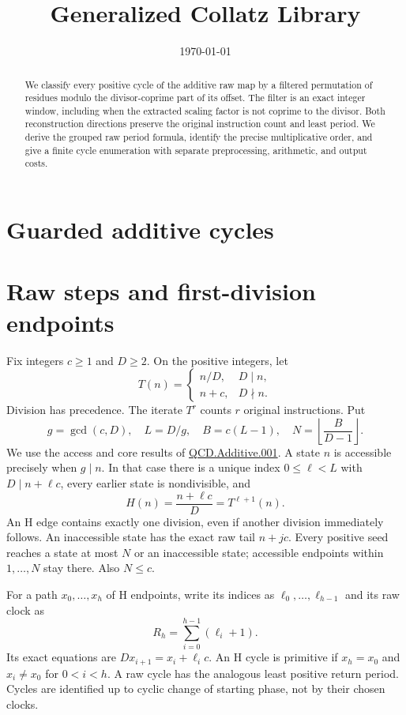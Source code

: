 \documentclass[11pt,letterpaper]{article}
\title{Generalized Collatz Library}
\author{}
\date{\today}
\begin{document}
\maketitle
\section*{Guarded additive cycles}

\begin{abstract}
We classify every positive cycle of the additive raw map by a filtered
permutation of residues modulo the divisor-coprime part of its offset.
The filter is an exact integer window, including when the extracted scaling
factor is not coprime to the divisor. Both reconstruction directions preserve
the original instruction count and least period. We derive the grouped raw
period formula, identify the precise multiplicative order, and give a finite
cycle enumeration with separate preprocessing, arithmetic, and output costs.
\end{abstract}

\section{Raw steps and first-division endpoints}

Fix integers $c\ge1$ and $D\ge2$. On the positive integers, let
\[
T(n)=\begin{cases}n/D,&D\mid n,\\n+c,&D\nmid n.\end{cases}
\]
Division has precedence. The iterate $T^r$ counts $r$ original instructions.
Put
\[
g=\gcd(c,D),\quad L=D/g,\quad B=c(L-1),\quad
N=\left\lfloor\frac{B}{D-1}\right\rfloor.
\]
We use the access and core results of
\href{../../QCD.Additive.001/tex/Additive.tex}{QCD.Additive.001}.
A state $n$ is accessible precisely when $g\mid n$. In that case there is a
unique index $0\le\ell<L$ with $D\mid n+\ell c$, every earlier state is
nondivisible, and
\[
H(n)=\frac{n+\ell c}{D}=T^{\ell+1}(n).
\]
An H edge contains exactly one division, even if another division immediately
follows. An inaccessible state has the exact raw tail $n+jc$.
Every positive seed reaches a state at most $N$ or an inaccessible state;
accessible endpoints within $1,\ldots,N$ stay there. Also $N\le c$.

For a path $x_0,\ldots,x_h$ of H endpoints, write its indices as
$\ell_0,\ldots,\ell_{h-1}$ and its raw clock as
\[
R_h=\sum_{i=0}^{h-1}(\ell_i+1).
\]
Its exact equations are $Dx_{i+1}=x_i+\ell_i c$.
An H cycle is primitive if $x_h=x_0$ and $x_i\ne x_0$ for $0<i<h$.
A raw cycle has the analogous least positive return period. Cycles are
identified up to cyclic change of starting phase, not by their chosen clocks.
\end{document}
